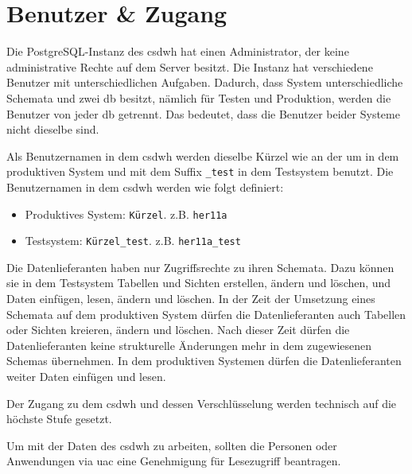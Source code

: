 \chapter{Benutzer \& Zugang} \label{ch:usr}

Die PostgreSQL-Instanz des \ac{csdwh} hat einen Administrator, der keine administrative Rechte auf dem Server besitzt. Die Instanz hat verschiedene Benutzer mit unterschiedlichen Aufgaben. Dadurch, dass System unterschiedliche Schemata und zwei \ac{db} besitzt, nämlich für Testen und Produktion, werden die Benutzer von jeder \ac{db} getrennt. Das bedeutet, dass die Benutzer beider Systeme nicht dieselbe sind. 

Als Benutzernamen in dem \ac{csdwh} werden dieselbe Kürzel wie an der \ac{um} in dem produktiven System und mit dem Suffix \texttt{\_test} in dem Testsystem benutzt. Die Benutzernamen in dem \ac{csdwh} werden wie folgt definiert:
\begin{itemize}
	\item Produktives System: \texttt{Kürzel}. z.B. \texttt{her11a}
	\item Testsystem: \texttt{Kürzel\_test}. z.B. \texttt{her11a\_test}
\end{itemize}

Die Datenlieferanten haben nur Zugriffsrechte zu ihren Schemata. Dazu können sie in dem Testsystem Tabellen und Sichten erstellen, ändern und löschen, und Daten einfügen, lesen, ändern und löschen. In der Zeit der Umsetzung eines Schemata auf dem produktiven System dürfen die Datenlieferanten auch Tabellen oder Sichten kreieren, ändern und löschen. Nach dieser Zeit dürfen die Datenlieferanten keine strukturelle Änderungen mehr in dem zugewiesenen Schemas übernehmen. In dem produktiven Systemen dürfen die Datenlieferanten weiter Daten einfügen und lesen.

Der Zugang zu dem \ac{csdwh} und dessen Verschlüsselung werden technisch auf die höchste Stufe gesetzt.

Um mit der Daten des \ac{csdwh} zu arbeiten, sollten die Personen oder Anwendungen via \ac{uac} eine Genehmigung für Lesezugriff beantragen.